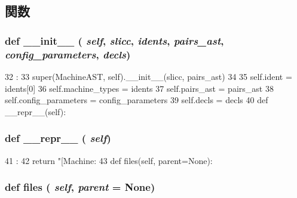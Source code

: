 \subsection{関数}
\hypertarget{classslicc_1_1ast_1_1MachineAST_1_1MachineAST_ac775ee34451fdfa742b318538164070e}{
\subsubsection[{\_\-\_\-init\_\-\_\-}]{\setlength{\rightskip}{0pt plus 5cm}def \_\-\_\-init\_\-\_\- ( {\em self}, \/   {\em slicc}, \/   {\em idents}, \/   {\em pairs\_\-ast}, \/   {\em config\_\-parameters}, \/   {\em decls})}}
\label{classslicc_1_1ast_1_1MachineAST_1_1MachineAST_ac775ee34451fdfa742b318538164070e}



\begin{DoxyCode}
32                                                                           :
33         super(MachineAST, self).__init__(slicc, pairs_ast)
34 
35         self.ident = idents[0]
36         self.machine_types = idents
37         self.pairs_ast = pairs_ast
38         self.config_parameters = config_parameters
39         self.decls = decls
40 
    def __repr__(self):
\end{DoxyCode}
\hypertarget{classslicc_1_1ast_1_1MachineAST_1_1MachineAST_ad8b9328939df072e4740cd9a63189744}{
\subsubsection[{\_\-\_\-repr\_\-\_\-}]{\setlength{\rightskip}{0pt plus 5cm}def \_\-\_\-repr\_\-\_\- ( {\em self})}}
\label{classslicc_1_1ast_1_1MachineAST_1_1MachineAST_ad8b9328939df072e4740cd9a63189744}



\begin{DoxyCode}
41                       :
42         return "[Machine: %
43 
    def files(self, parent=None):
\end{DoxyCode}
\hypertarget{classslicc_1_1ast_1_1MachineAST_1_1MachineAST_a35b1a87f6fcbddeb5b793b0e415765f8}{
\subsubsection[{files}]{\setlength{\rightskip}{0pt plus 5cm}def files ( {\em self}, \/   {\em parent} = {\ttfamily None})}}
\label{classslicc_1_1ast_1_1MachineAST_1_1MachineAST_a35b1a87f6fcbddeb5b793b0e415765f8}


